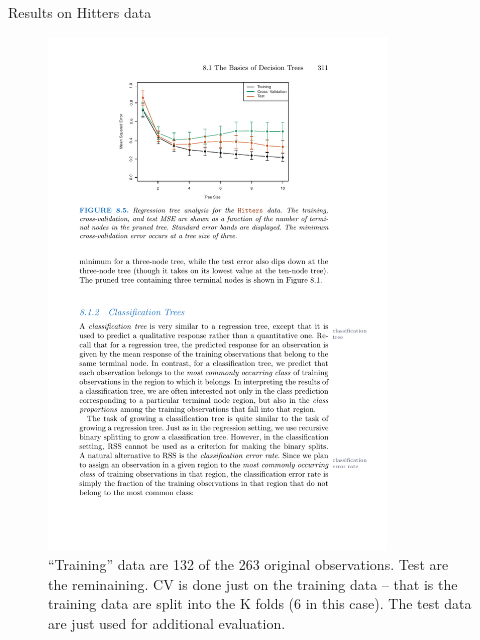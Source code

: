 \documentclass[mathserif, aspectratio=169]{beamer}
\begin{document}
\begin{frame}{Results on Hitters data}
\begin{figure}
\includegraphics[width=0.8\textwidth]{MSE_vs_treesize}
\caption*{``Training'' data are 132 of the 263 original observations.  Test are the reminaining.  CV is done just on the training data -- that is the training data are split into the K folds (6 in this case).  The test data are just used for additional evaluation.}
\end{figure}
\end{frame}
\end{document}
